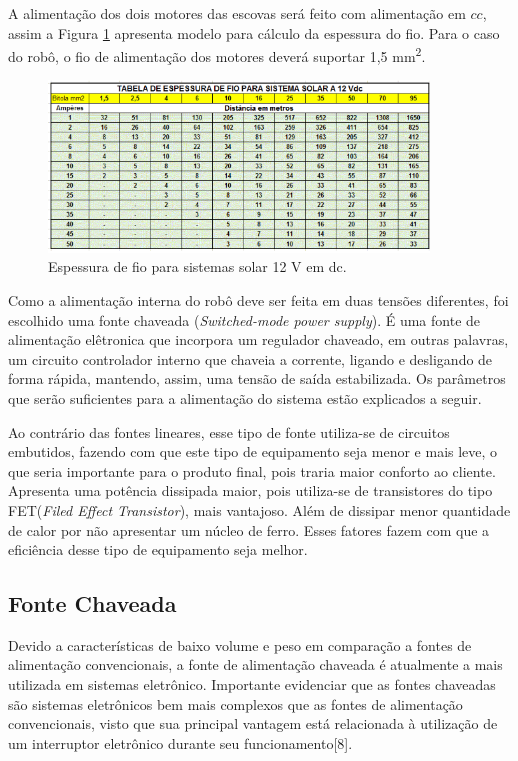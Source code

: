 A alimentação dos dois motores das escovas será feito com alimentação em $cc$, assim a Figura \ref{fig:table-wire} apresenta modelo para cálculo da espessura do fio. Para o caso do robô, o fio de alimentação dos motores deverá suportar 1,5 mm\textsuperscript{2}.
\par
\begin{figure}[h]
  \centering
  \includegraphics[width=0.9\textwidth]{figures/table-wire.png}
  \caption{Espessura de fio para sistemas solar 12 V em dc.}
  \label{fig:table-wire}
\end{figure}
\FloatBarrier
\par
Como a alimentação interna do robô deve ser feita em duas tensões diferentes, foi escolhido uma fonte chaveada (\textit{Switched-mode power supply}). É uma fonte de alimentação elêtronica que incorpora um regulador chaveado, em outras palavras, um circuito controlador interno que chaveia a corrente, ligando e desligando de forma rápida, mantendo, assim, uma tensão de saída estabilizada. Os parâmetros que serão suficientes para a alimentação do sistema estão explicados a seguir.

Ao contrário das fontes lineares, esse tipo de fonte utiliza-se de circuitos embutidos, fazendo com que este tipo de equipamento seja menor e mais leve, o que seria importante para o produto final, pois traria maior conforto ao cliente. Apresenta uma potência dissipada maior, pois utiliza-se de transistores do tipo FET(\textit{Filed Effect Transistor}), mais vantajoso. Além de dissipar menor quantidade de calor por não apresentar um núcleo de ferro. Esses fatores fazem com que a eficiência desse tipo de equipamento seja melhor.

\subsection{Fonte Chaveada}
Devido a características de baixo volume e peso em comparação a fontes de alimentação convencionais, a fonte de alimentação chaveada é atualmente a mais utilizada em sistemas eletrônico. Importante evidenciar que as fontes chaveadas são sistemas eletrônicos bem mais complexos que as fontes de alimentação convencionais, visto que sua principal vantagem está relacionada à utilização de um interruptor eletrônico durante seu funcionamento[8].


